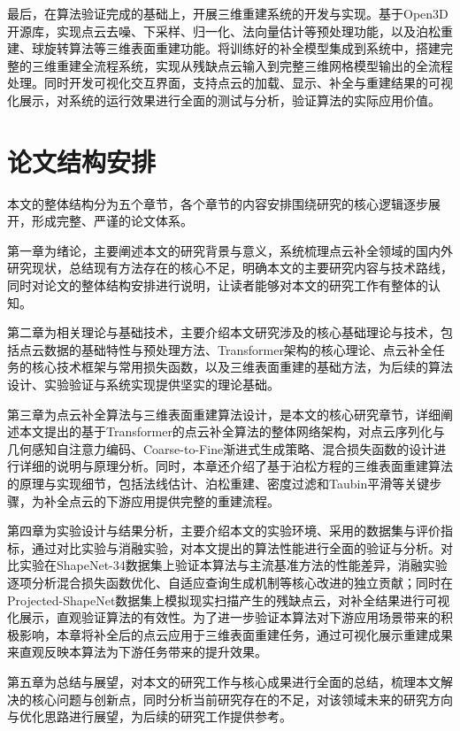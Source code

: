 最后，在算法验证完成的基础上，开展三维重建系统的开发与实现。基于Open3D开源库，实现点云去噪、下采样、归一化、法向量估计等预处理功能，以及泊松重建、球旋转算法等三维表面重建功能。将训练好的补全模型集成到系统中，搭建完整的三维重建全流程系统，实现从残缺点云输入到完整三维网格模型输出的全流程处理。同时开发可视化交互界面，支持点云的加载、显示、补全与重建结果的可视化展示，对系统的运行效果进行全面的测试与分析，验证算法的实际应用价值。

\section{论文结构安排}
本文的整体结构分为五个章节，各个章节的内容安排围绕研究的核心逻辑逐步展开，形成完整、严谨的论文体系。

第一章为绪论，主要阐述本文的研究背景与意义，系统梳理点云补全领域的国内外研究现状，总结现有方法存在的核心不足，明确本文的主要研究内容与技术路线，同时对论文的整体结构安排进行说明，让读者能够对本文的研究工作有整体的认知。

第二章为相关理论与基础技术，主要介绍本文研究涉及的核心基础理论与技术，包括点云数据的基础特性与预处理方法、Transformer架构的核心理论、点云补全任务的核心技术框架与常用损失函数，以及三维表面重建的基础方法，为后续的算法设计、实验验证与系统实现提供坚实的理论基础。

第三章为点云补全算法与三维表面重建算法设计，是本文的核心研究章节，详细阐述本文提出的基于Transformer的点云补全算法的整体网络架构，对点云序列化与几何感知自注意力编码、Coarse-to-Fine渐进式生成策略、混合损失函数的设计进行详细的说明与原理分析。同时，本章还介绍了基于泊松方程的三维表面重建算法的原理与实现细节，包括法线估计、泊松重建、密度过滤和Taubin平滑等关键步骤，为补全点云的下游应用提供完整的重建流程。

第四章为实验设计与结果分析，主要介绍本文的实验环境、采用的数据集与评价指标，通过对比实验与消融实验，对本文提出的算法性能进行全面的验证与分析。对比实验在ShapeNet-34数据集上验证本算法与主流基准方法的性能差异，消融实验逐项分析混合损失函数优化、自适应查询生成机制等核心改进的独立贡献；同时在Projected-ShapeNet数据集上模拟现实扫描产生的残缺点云，对补全结果进行可视化展示，直观验证算法的有效性。为了进一步验证本算法对下游应用场景带来的积极影响，本章将补全后的点云应用于三维表面重建任务，通过可视化展示重建成果来直观反映本算法为下游任务带来的提升效果。

第五章为总结与展望，对本文的研究工作与核心成果进行全面的总结，梳理本文解决的核心问题与创新点，同时分析当前研究存在的不足，对该领域未来的研究方向与优化思路进行展望，为后续的研究工作提供参考。
